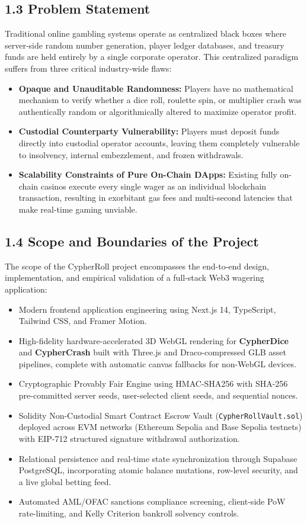 \subsection*{1.3 Problem Statement}
Traditional online gambling systems operate as centralized black boxes where server-side random number generation, player ledger databases, and treasury funds are held entirely by a single corporate operator. This centralized paradigm suffers from three critical industry-wide flaws:
\begin{itemize}[leftmargin=*]
    \item \textbf{Opaque and Unauditable Randomness:} Players have no mathematical mechanism to verify whether a dice roll, roulette spin, or multiplier crash was authentically random or algorithmically altered to maximize operator profit.
    \item \textbf{Custodial Counterparty Vulnerability:} Players must deposit funds directly into custodial operator accounts, leaving them completely vulnerable to insolvency, internal embezzlement, and frozen withdrawals.
    \item \textbf{Scalability Constraints of Pure On-Chain DApps:} Existing fully on-chain casinos execute every single wager as an individual blockchain transaction, resulting in exorbitant gas fees and multi-second latencies that make real-time gaming unviable.
\end{itemize}

\subsection*{1.4 Scope and Boundaries of the Project}
The scope of the CypherRoll project encompasses the end-to-end design, implementation, and empirical validation of a full-stack Web3 wagering application:
\begin{itemize}[leftmargin=*]
    \item Modern frontend application engineering using Next.js 14, TypeScript, Tailwind CSS, and Framer Motion.
    \item High-fidelity hardware-accelerated 3D WebGL rendering for \textbf{CypherDice} and \textbf{CypherCrash} built with Three.js and Draco-compressed GLB asset pipelines, complete with automatic canvas fallbacks for non-WebGL devices.
    \item Cryptographic Provably Fair Engine using HMAC-SHA256 with SHA-256 pre-committed server seeds, user-selected client seeds, and sequential nonces.
    \item Solidity Non-Custodial Smart Contract Escrow Vault (\texttt{CypherRollVault.sol}) deployed across EVM networks (Ethereum Sepolia and Base Sepolia testnets) with EIP-712 structured signature withdrawal authorization.
    \item Relational persistence and real-time state synchronization through Supabase PostgreSQL, incorporating atomic balance mutations, row-level security, and a live global betting feed.
    \item Automated AML/OFAC sanctions compliance screening, client-side PoW rate-limiting, and Kelly Criterion bankroll solvency controls.
\end{itemize}

